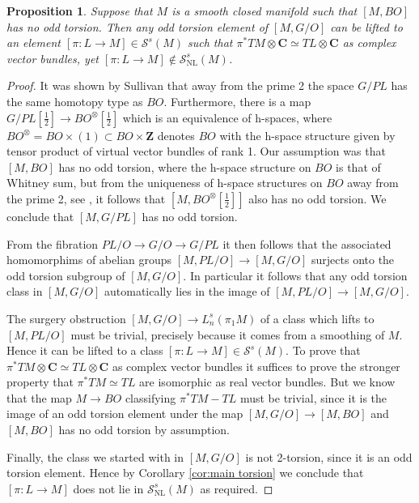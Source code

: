 \documentclass[reqno]{amsart}
\theoremstyle{theorem}
\newtheorem{proposition}[corollary]{Proposition}
\theoremstyle{remark}
\theoremstyle{definition}
\newcommand{\bZ}{\mathbf{Z}}
\newcommand{\NL}{\mathrm{NL}}
\renewcommand{\SS}{\mathcal{S}}
\begin{document}
\begin{proposition}\label{lem: criterion}
Suppose that $M$ is a smooth closed manifold such that $[M, BO]$ has no odd torsion. Then any odd torsion element of $[M,G/O]$ can be lifted to an element $[\pi:L \to M] \in \SS^s(M)$ such that $\pi^*TM \otimes \mathbf{C} \simeq TL \otimes \mathbf{C}$ as complex vector bundles, yet $[\pi:L \to M] \not\in \SS^s_\NL(M)$. 
\end{proposition}




\begin{proof}
  It was shown by Sullivan that away from the prime 2 the space $G/PL$ has the same homotopy type as $BO$. Furthermore, there is a map $G/PL[\frac{1}{2}] \to BO^{\otimes}[\frac{1}{2}]$ which is an equivalence of h-spaces, where $BO^{\otimes} = BO \times (1) \subset BO \times \bZ$  denotes $BO$ with the h-space structure given by tensor product of virtual vector bundles of rank 1. Our assumption was that $[M,BO]$ has no odd torsion, where the h-space structure on $BO$ is that of Whitney sum, but from the uniqueness of h-space structures on $BO$ away from the prime 2, see \cite{AP}, it follows that $[M,BO^{\otimes}[\frac{1}{2}]]$ also has no odd torsion. We conclude that $[M,G/PL]$ has no odd torsion. 
  
From the fibration $PL/O \to G/O \to G/PL$ it then follows that the associated homomorphims of abelian groups $[M,PL/O] \to [M,G/O]$ surjects onto the odd torsion subgroup of $[M,G/O]$. In particular it follows that any odd torsion class in $[M,G/O]$ automatically lies in the image of $[M, PL/O] \to [M, G/O]$.
  
  The surgery obstruction $[M, G/O] \to L^s_n(\pi_1M)$ of a class which lifts to $[M,PL/O]$ must be trivial, precisely because it comes from a smoothing of $M$. Hence it can be lifted to a class $[\pi:L \to M] \in \SS^s(M)$. To prove that $\pi^*TM \otimes \mathbf{C} \simeq TL \otimes \mathbf{C}$ as complex vector bundles it suffices to prove the stronger property that $\pi^*TM \simeq TL$ are isomorphic as real vector bundles. But we know that the map $M \to BO$ classifying $\pi^*TM - TL$ must be trivial, since it is the image of an odd torsion element under the map $[M, G/O] \to [M, BO]$ and $[M, BO]$ has no odd torsion by assumption. 
  
  Finally, the class we started with in $[M, G/O]$ is not 2-torsion, since it is an odd torsion element. Hence by Corollary \ref{cor:main torsion} we conclude that $[\pi:L \to M]$ does not lie in $\SS^s_\NL(M)$ as required.
\end{proof}
\end{document}
